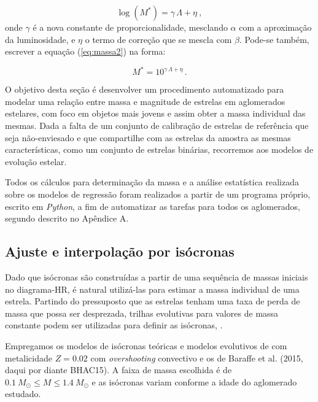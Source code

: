         \begin{equation}
            \label{eq:massa2}
            \log(M^*) =  \gamma \, \Lambda + \eta ~,
        \end{equation}
        \noindent onde \(\gamma\) é a nova constante de proporcionalidade, mesclando \(\alpha\) com a aproximação da luminosidade, e \(\eta\) o termo de correção que se mescla com \(\beta\). Pode-se também, escrever a equação (\ref{eq:massa2}) na forma:
        
        \begin{equation}
            \label{eq:massaf}
            M^* =  10^{\gamma \, \Lambda + \eta} \, .
        \end{equation}

         O objetivo desta seção é desenvolver um procedimento automatizado para modelar uma relação entre massa e magnitude de estrelas em aglomerados estelares, com foco em objetos mais jovens e assim obter a massa individual das mesmas. Dada a falta de um conjunto de calibração de estrelas de referência que seja não-enviesado e que compartilhe com as estrelas da amostra as mesmas características, como um conjunto de estrelas binárias, recorremos aos modelos de evolução estelar.

        Todos os cálculos para determinação da massa e a análise estatística realizada sobre os modelos de regressão foram realizados a partir de um programa próprio, escrito em \textit{Python}, a fim de automatizar as tarefas para todos os aglomerados, segundo descrito no Apêndice A.  
       
    \subsection{Ajuste e interpolação por isócronas}\label{subsec:isocfit}
        Dado que isócronas são construídas a partir de uma sequência de massas iniciais no diagrama-HR, é natural utilizá-las para estimar a massa individual de uma estrela. Partindo do pressuposto que as estrelas tenham uma taxa de perda de massa que possa ser desprezada, trilhas evolutivas para valores de massa constante podem ser utilizadas para definir as isócronas, \cite{serenelli2021weighing}.
        
        Empregamos os modelos de isócronas teóricas e modelos evolutivos de  com metalicidade \(Z = 0.02\) com \textit{overshooting} convectivo e os de  Baraffe et al. (2015, daqui por diante BHAC15). A faixa de massa escolhida é de \(0.1 ~M_\odot\leq M \leq 1.4~M_\odot\) e as isócronas variam conforme a idade do aglomerado estudado.

